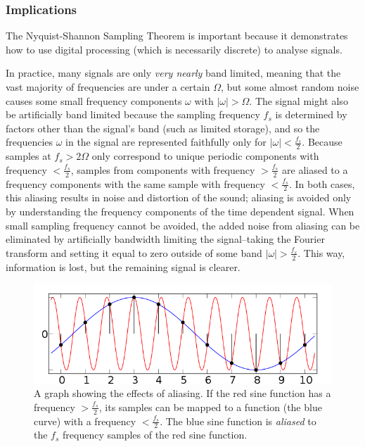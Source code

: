 \documentclass[12pt]{article}
\begin{document}
\subsubsection{Implications}

The Nyquist-Shannon Sampling Theorem is important because it demonstrates how
to use digital processing (which is necessarily discrete) to analyse signals. 

In practice, many signals are only \emph{very nearly} band limited, meaning
that the vast majority of frequencies are under a certain \( \Omega \), but
some almost random noise causes some small frequency components \( \omega \)
with \( |\omega| > \Omega \). The signal might also be artificially band
limited because the sampling frequency \( f_s\) is determined by factors other
than the signal's band (such as limited storage), and so the frequencies \(
\omega \) in the signal are represented faithfully only for \(|\omega| <
\frac{f_s}{2} \). Because samples at \( f_s > 2\Omega \) only correspond to
unique periodic components with frequency \( < \frac{f_s}{2} \), samples from
components with frequency \( > \frac{f_s}{2} \) are aliased to a frequency
components with the same sample with frequency \( < \frac{f_s}{2} \). In both
cases, this aliasing results in noise and distortion of the sound; aliasing is
avoided only by understanding the frequency components of the time dependent
signal. When small sampling frequency cannot be avoided, the added noise from
aliasing can be eliminated by artificially bandwidth limiting the
signal--taking the Fourier transform and setting it equal to zero outside of
some band \( |\omega| > \frac{f_s}{2}  \). This way, information is lost, but
the remaining signal is clearer. 

\begin{figure}[H]
\begin{centering}
\includegraphics[width=.5\linewidth]{AliasingSines.png}
\caption{A graph showing the effects of aliasing. If the red sine function 
has a frequency \( > \frac{f_s}{2}\), its samples can be mapped to a function
(the blue curve) with a frequency \( < \frac{f_s}{2}\). The blue sine 
function is \emph{aliased} to the \( f_s\) frequency samples of the red sine
function.}
\end{centering}
\end{figure}
\end{document}
